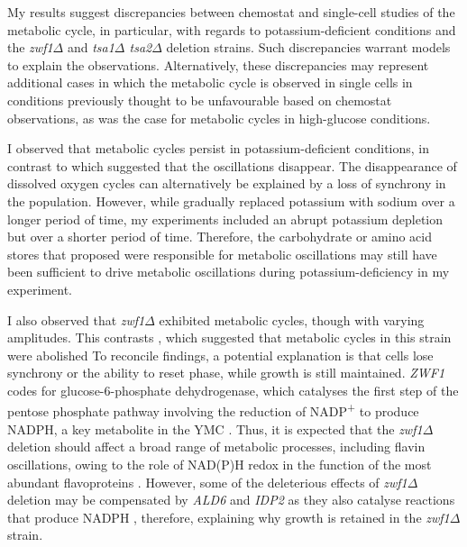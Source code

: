 My results suggest discrepancies between chemostat and single-cell studies of the metabolic cycle, in particular, with regards to potassium-deficient conditions and the \textit{zwf1$\Delta$} and \textit{tsa1$\Delta$ tsa2$\Delta$} deletion strains.
Such discrepancies warrant models to explain the observations.
Alternatively, these discrepancies may represent additional cases in which the metabolic cycle is observed in single cells in conditions previously thought to be unfavourable based on chemostat observations, as was the case for metabolic cycles in high-glucose conditions.

I observed that metabolic cycles persist in potassium-deficient conditions, in contrast to \textcite{oneillEukaryoticCellBiology2020} which suggested that the oscillations disappear.
The disappearance of dissolved oxygen cycles can alternatively be explained by a loss of synchrony in the population.
However, while \textcite{oneillEukaryoticCellBiology2020} gradually replaced potassium with sodium over a longer period of time, my experiments included an abrupt potassium depletion but over a shorter period of time.
Therefore, the carbohydrate or amino acid stores that \textcite{oneillEukaryoticCellBiology2020} proposed were responsible for metabolic oscillations may still have been sufficient to drive metabolic oscillations during potassium-deficiency in my experiment.

I also observed that \textit{zwf1$\Delta$} exhibited metabolic cycles, though with varying amplitudes.
This contrasts \textcite{tuCyclicChangesMetabolic2007}, which suggested that metabolic cycles in this strain were abolished
To reconcile findings, a potential explanation is that cells lose synchrony or the ability to reset phase, while growth is still maintained.
\textit{ZWF1} codes for glucose-6-phosphate dehydrogenase, which catalyses the first step of the pentose phosphate pathway involving the reduction of NADP\textsuperscript{+} to produce NADPH, a key metabolite in the YMC \parencite{nogaeIsolationCharacterizationZWF11990}.
Thus, it is expected that the \textit{zwf1$\Delta$} deletion should affect a broad range of metabolic processes, including flavin oscillations, owing to the role of NAD(P)H redox in the function of the most abundant flavoproteins \parencite{gudipatiFlavoproteomeYeastSaccharomyces2014}.
However, some of the deleterious effects of \textit{zwf1$\Delta$} deletion may be compensated by \textit{ALD6} and \textit{IDP2} as they also catalyse reactions that produce NADPH \parencite{minardSourcesNADPHYeast2005}, therefore, explaining why growth is retained in the \textit{zwf1$\Delta$} strain.

